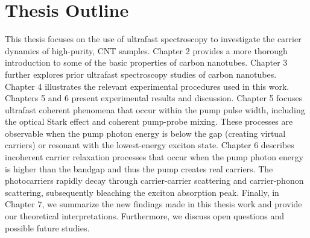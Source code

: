 \section{Thesis Outline}

This thesis focuses on the use of ultrafast spectroscopy to investigate the carrier dynamics of high-purity, CNT samples. Chapter 2 provides a more thorough introduction to some of the basic properties of carbon nanotubes. Chapter 3 further explores prior ultrafast spectroscopy studies of carbon nanotubes. Chapter 4 illustrates the relevant experimental procedures used in this work. Chapters 5 and 6 present experimental results and discussion.  Chapter 5 focuses ultrafast coherent phenomena that occur within the pump pulse width, including the optical Stark effect and coherent pump-probe mixing.  These processes are observable when the pump photon energy is below the gap (creating virtual carriers) or resonant with the lowest-energy exciton state.  Chapter 6 describes incoherent carrier relaxation processes that occur when the pump photon energy is higher than the bandgap and thus the pump creates real carriers. The photocarriers rapidly decay through carrier-carrier scattering and carrier-phonon scattering, subsequently bleaching the exciton absorption peak.  Finally, in Chapter 7, we summarize the new findings made in this thesis work and provide our theoretical interpretations.  Furthermore, we discuss open questions and possible future studies.
